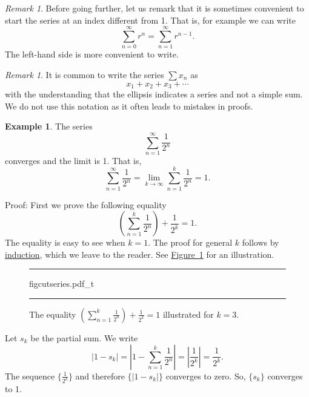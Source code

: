 \documentclass[12pt]{book}
\newenvironment{myfigureht}{%
\begin{figure}[h!t]
\noindent\rule{\textwidth}{0.4pt}\vspace{12pt}\par\centering}%
{\par\noindent\rule{\textwidth}{0.4pt}
\end{figure}}
\newcommand{\abs}[1]{\left\lvert {#1} \right\rvert}
\theoremstyle{plain}
\theoremstyle{remark}
\newtheorem{remark}[thm]{Remark}
\theoremstyle{definition}
\theoremstyle{exercise}
\theoremstyle{example}
\newtheorem{example}[thm]{Example}
\newcommand{\figureref}[1]{\hyperref[#1]{Figure~\ref*{#1}}}
\begin{document}
\begin{remark}
Before going further, let us remark that it is sometimes convenient to start
the series at an index different from 1.  That is, for example we can write
\begin{equation*}
\sum_{n=0}^\infty r^n = \sum_{n=1}^\infty r^{n-1} .
\end{equation*}
The left-hand side is more convenient to write.
\end{remark}

\begin{remark}
It is common to write the series $\sum x_n$ as
\begin{equation*}
x_1 + x_2 + x_3 + \cdots
\end{equation*}
with the understanding that the ellipsis indicates a series and
not a simple sum.  We do not use this notation as it often leads to 
mistakes in proofs.
\end{remark}

\begin{example}
The series
\begin{equation*}
\sum_{n=1}^\infty \frac{1}{2^n}
\end{equation*}
converges and the limit is 1.  That is,
\begin{equation*}
\sum_{n=1}^\infty \frac{1}{2^n} = 
\lim_{k\to\infty} \sum_{n=1}^k \frac{1}{2^n} = 
1 .
\end{equation*}

Proof: First we prove the following equality
\begin{equation*}
\left( \sum_{n=1}^k \frac{1}{2^n} \right)
+ \frac{1}{2^k}
= 1 .
\end{equation*}
The equality is easy to see when $k=1$.  The proof for general $k$
follows by \hyperref[induction:thm]{induction}, which we leave to the
reader.  See \figureref{figcutseries} for an illustration.
\begin{myfigureht}
{figcutseries.pdf_t}
\caption{The equality 
$\left( \sum_{n=1}^k \frac{1}{2^n} \right)
+ \frac{1}{2^k}
= 1$ illustrated for $k=3$.\label{figcutseries}}
\end{myfigureht}

Let $s_k$ be the partial sum.  We write
\begin{equation*}
\abs{
1 - s_k 
}
=
\abs{
1 - 
\sum_{n=1}^k \frac{1}{2^n}
}
=
\abs{\frac{1}{2^k}} = 
\frac{1}{2^k} .
\end{equation*}
The sequence $\{ \frac{1}{2^k} \}$ and therefore $\{ \abs{1-s_k} \}$
converges to zero.  So, $\{ s_k \}$ converges to 1.
\end{example}
\end{document}
